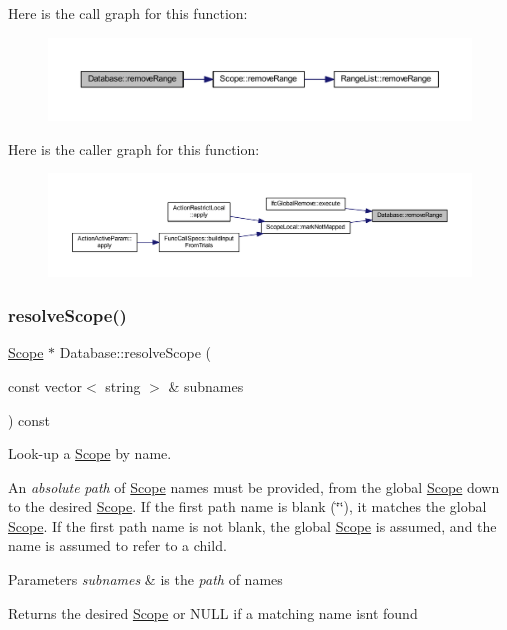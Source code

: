 Here is the call graph for this function\+:
\nopagebreak
\begin{figure}[H]
\begin{center}
\leavevmode
\includegraphics[width=350pt]{class_database_a4db50bb44cfc56d4102f102c0ddbf423_cgraph}
\end{center}
\end{figure}
Here is the caller graph for this function\+:
\nopagebreak
\begin{figure}[H]
\begin{center}
\leavevmode
\includegraphics[width=350pt]{class_database_a4db50bb44cfc56d4102f102c0ddbf423_icgraph}
\end{center}
\end{figure}
\mbox{\label{class_database_a452ac8a13c82d53b20606b18202475ae}} 
\subsubsection{\texorpdfstring{resolveScope()}{resolveScope()}}
{\footnotesize\ttfamily \mbox{\hyperlink{class_scope}{Scope}} $\ast$ Database\+::resolve\+Scope (\begin{DoxyParamCaption}\item[{const vector$<$ string $>$ \&}]{subnames }\end{DoxyParamCaption}) const}



Look-\/up a \mbox{\hyperlink{class_scope}{Scope}} by name. 

An {\itshape absolute} {\itshape path} of \mbox{\hyperlink{class_scope}{Scope}} names must be provided, from the global \mbox{\hyperlink{class_scope}{Scope}} down to the desired \mbox{\hyperlink{class_scope}{Scope}}. If the first path name is blank (\char`\"{}\char`\"{}), it matches the global \mbox{\hyperlink{class_scope}{Scope}}. If the first path name is not blank, the global \mbox{\hyperlink{class_scope}{Scope}} is assumed, and the name is assumed to refer to a child. 
\begin{DoxyParams}{Parameters}
{\em subnames} & is the {\itshape path} of names \\
\hline
\end{DoxyParams}
\begin{DoxyReturn}{Returns}
the desired \mbox{\hyperlink{class_scope}{Scope}} or N\+U\+LL if a matching name isn\textquotesingle{}t found 
\end{DoxyReturn}


